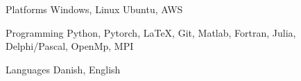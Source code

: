 

\begin{cvskills}

  \cvskill
    {Platforms} %
    {Windows, Linux Ubuntu, AWS} %


  \cvskill
    {Programming} %
    {Python, Pytorch, LaTeX, Git, Matlab, Fortran, Julia, Delphi/Pascal, OpenMp, MPI} %

  \cvskill
    {Languages} %
    {Danish, English} %

\end{cvskills}
